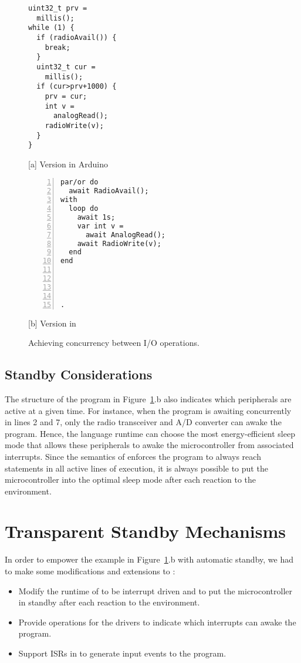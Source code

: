 \begin{figure}[t]
\begin{minipage}[t]{0.49\linewidth}
\begin{lstlisting}[xrightmargin=0.5cm]
uint32_t prv =
  millis();
while (1) {
  if (radioAvail()) {
    break;
  }
  uint32_t cur =
    millis();
  if (cur>prv+1000) {
    prv = cur;
    int v =
      analogRead();
    radioWrite(v);
  }
}
\end{lstlisting}
\centering\small{[a] Version in Arduino}
\end{minipage}
%
\begin{minipage}[t]{0.49\linewidth}
\begin{lstlisting}[numbers=left,xleftmargin=-0.2cm]
par/or do
  await RadioAvail();
with
  loop do
    await 1s;
    var int v =
      await AnalogRead();
    await RadioWrite(v);
  end
end




.
\end{lstlisting}
\centering\small{[b] Version in \CEU}
\end{minipage}
\caption{ Achieving concurrency between I/O operations.
\label{lst.inversion}
}
\end{figure}

\subsection*{Standby Considerations}
\label{sec.ceu.standby}

The structure of the program in Figure~\ref{lst.inversion}.b also indicates
which peripherals are active at a given time.
%
For instance, when the program is awaiting concurrently in lines 2 and 7,
only the radio transceiver and A/D converter can awake the program.
Hence, the language runtime can choose the most energy-efficient sleep mode
that allows these peripherals to awake the microcontroller from associated
interrupts.
%
Since the semantics of \CEU enforces the program to always reach 
statements in all active lines of execution, it is always possible to put the
microcontroller into the optimal sleep mode after each reaction to the
environment.

\section{Transparent Standby Mechanisms}
\label{sec.standby}

In order to empower the example in Figure~\ref{lst.inversion}.b with automatic
standby, we had to make some modifications and extensions to \CEU:
%
\begin{itemize}
\item Modify the runtime of \CEU to be interrupt driven and to put the
      microcontroller in standby after each reaction to the environment.
\item Provide operations for the drivers to indicate which interrupts can awake
      the program.
\item Support ISRs in \CEU to generate input events to the program.
\end{itemize}

